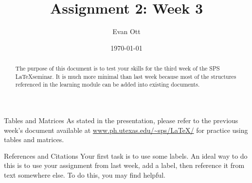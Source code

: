 \documentclass[onecolumn]{article}
\title{Assignment 2: Week 3}
\author{Evan Ott}
\date{\today}
\begin{document}
\maketitle
\begin{abstract}
The purpose of this document is to test your skills for the third week of the SPS \LaTeX seminar. It is much more minimal than last week because most of the structures referenced in the learning
module can be added into existing documents.
\end{abstract}
\tableofcontents
\begin{multicols}{2}
\begin{section}{Tables and Matrices}
As stated in the presentation, please refer to the previous week's document available at \url{www.ph.utexas.edu/~sps/LaTeX/} for practice using tables and matrices.
\end{section}
\end{multicols}

\begin{section}{References and Citations}
Your first task is to use some labels. An ideal way to do this is to use your assignment from last week, add a label, then reference it from text somewhere else. To do this, you may find \cite{sps} helpful.
\end{section}
\end{document}
